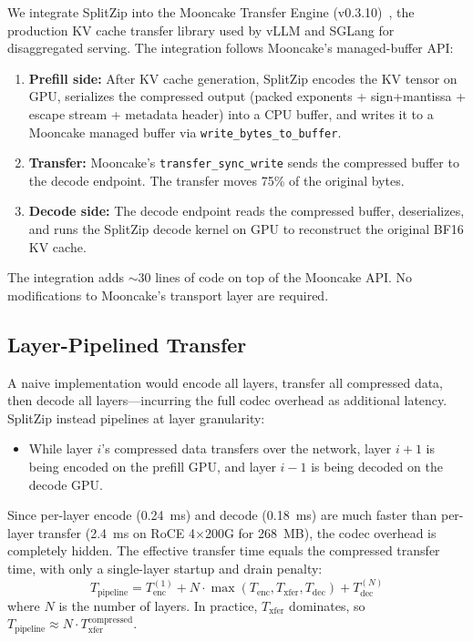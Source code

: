 We integrate SplitZip into the Mooncake Transfer Engine (v0.3.10)~\cite{mooncake}, the production KV cache transfer library used by vLLM and SGLang for disaggregated serving. The integration follows Mooncake's managed-buffer API:

\begin{enumerate}[nosep,leftmargin=*]
\item \textbf{Prefill side:} After KV cache generation, SplitZip encodes the KV tensor on GPU, serializes the compressed output (packed exponents + sign+mantissa + escape stream + metadata header) into a CPU buffer, and writes it to a Mooncake managed buffer via \texttt{write\_bytes\_to\_buffer}.
\item \textbf{Transfer:} Mooncake's \texttt{transfer\_sync\_write} sends the compressed buffer to the decode endpoint. The transfer moves 75\% of the original bytes.
\item \textbf{Decode side:} The decode endpoint reads the compressed buffer, deserializes, and runs the SplitZip decode kernel on GPU to reconstruct the original BF16 KV cache.
\end{enumerate}

The integration adds $\sim$30 lines of code on top of the Mooncake API. No modifications to Mooncake's transport layer are required.

\subsection{Layer-Pipelined Transfer}

A naive implementation would encode all layers, transfer all compressed data, then decode all layers---incurring the full codec overhead as additional latency. SplitZip instead pipelines at layer granularity:

\begin{itemize}[nosep,leftmargin=*]
\item While layer $i$'s compressed data transfers over the network, layer $i+1$ is being encoded on the prefill GPU, and layer $i-1$ is being decoded on the decode GPU.
\end{itemize}

Since per-layer encode (0.24~ms) and decode (0.18~ms) are much faster than per-layer transfer (2.4~ms on RoCE 4$\times$200G for 268~MB), the codec overhead is completely hidden. The effective transfer time equals the compressed transfer time, with only a single-layer startup and drain penalty:
\[
T_{\text{pipeline}} = T_{\text{enc}}^{(1)} + N \cdot \max(T_{\text{enc}}, T_{\text{xfer}}, T_{\text{dec}}) + T_{\text{dec}}^{(N)}
\]
where $N$ is the number of layers. In practice, $T_{\text{xfer}}$ dominates, so $T_{\text{pipeline}} \approx N \cdot T_{\text{xfer}}^{\text{compressed}}$.
